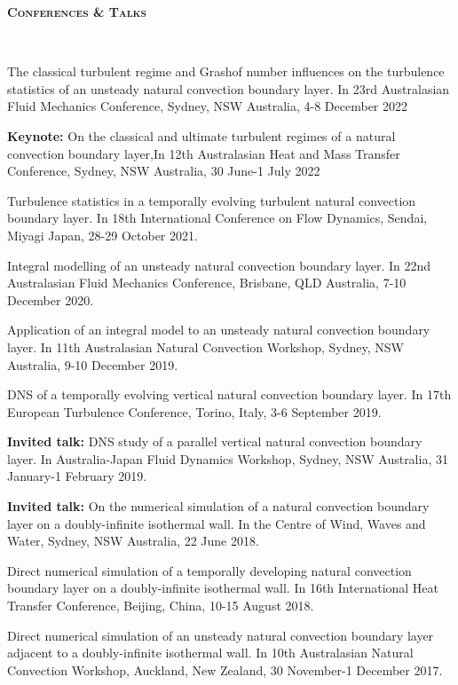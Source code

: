 \documentclass[letterpaper, 10pt]{article}
\newenvironment{changemargin}[2]{%
  \begin{list}{}{%
      \setlength{\topsep}{0pt}%
      \setlength{\leftmargin}{#1}%
      \setlength{\rightmargin}{#2}%
      \setlength{\listparindent}{\parindent}%
      \setlength{\itemindent}{\parindent}%
      \setlength{\parsep}{\parskip}%
    }%
  \item[]}{\end{list}
}
\newcommand{\lineover}{
  \begin{changemargin}{-0.05in}{-0.05in}
    \vspace*{-8pt}
    \hrulefill \\
    \vspace*{-2pt}
  \end{changemargin}
}
\newcommand{\header}[1]{
  \begin{changemargin}{-0.5in}{-0.5in}
    \textbf{\scshape{#1}}\\
    \lineover
  \end{changemargin}
}
\newenvironment{body} {
  \vspace*{-16pt}
  \begin{changemargin}{-0.25in}{-0.5in}
  }
  {\end{changemargin}
}
\begin{document}
\header{Conferences \& Talks}
\begin{body}
  \vspace{14pt}
  
  The classical turbulent regime and Grashof number influences on the turbulence statistics of an unsteady natural convection boundary layer. In 23rd Australasian Fluid Mechanics Conference, Sydney, NSW Australia, 4-8 December 2022
  
  \smallskip
  
  {\bf Keynote: } On the classical and ultimate turbulent regimes of a natural convection boundary layer,In 12th Australasian Heat and Mass Transfer Conference, Sydney, NSW Australia, 30 June-1 July 2022
  
  \smallskip

    Turbulence statistics in a temporally evolving turbulent natural convection boundary layer. In 18th International Conference on Flow Dynamics, Sendai, Miyagi Japan, 28-29 October 2021.

  \smallskip

  Integral modelling of an unsteady natural convection boundary layer. In 22nd Australasian Fluid Mechanics Conference, Brisbane, QLD Australia, 7-10 December 2020.
  
  \smallskip
  
  Application of an integral model to an unsteady natural convection boundary layer. In 11th Australasian Natural Convection Workshop, Sydney, NSW Australia, 9-10 December 2019.
  
  \smallskip
  
  DNS of a temporally evolving vertical natural convection boundary layer. In 17th European Turbulence Conference, Torino, Italy, 3-6 September 2019.
  
  \smallskip
  
  {\bf Invited talk: } DNS study of a parallel vertical natural convection boundary layer. In Australia-Japan Fluid Dynamics Workshop, Sydney, NSW Australia, 31 January-1 February 2019.
  
  \smallskip
  
  {\bf Invited talk: } On the numerical simulation of a natural convection boundary layer on a doubly-infinite isothermal wall. In the Centre of Wind, Waves and Water, Sydney, NSW Australia, 22 June 2018.
  
  Direct numerical simulation of a temporally developing natural convection boundary layer on a doubly-infinite isothermal wall. In 16th International Heat Transfer Conference, Beijing, China, 10-15 August 2018. 
  
  \smallskip
  
  Direct numerical simulation of an unsteady natural convection boundary layer adjacent to a doubly-infinite isothermal wall. In 10th Australasian Natural Convection Workshop, Auckland, New Zealand, 30 November-1 December 2017.

\end{body}
\smallskip
\end{document}
